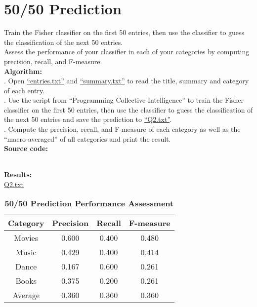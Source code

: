 \documentclass{article}
\begin{document}
		\section{50/50 Prediction}
		Train the Fisher classifier on the first 50 entries, then use the classifier to guess the classification of the
next 50 entries.\\
		\indent Assess the performance of your classifier in each of your categories by computing precision, recall, and F-measure.\\

		\noindent\textbf{Algorithm:}\\
		. Open \href{https://github.com/zhangboroy/cs532-s17/blob/master/assg09_submission/entries.txt}{``entries.txt''} and \href{https://github.com/zhangboroy/cs532-s17/blob/master/assg09_submission/summary.txt}{``summary.txt''} to read the title, summary and category of each entry.\\
		. Use the script from ``Programming Collective Intelligence'' to train the Fisher classifier on the first 50 entries, then use the classifier to guess the classification of the next 50 entries and save the prediction to \href{https://github.com/zhangboroy/cs532-s17/blob/master/assg09_submission/Q2.txt}{``Q2.txt''}.\\
		. Compute the precision, recall, and F-measure of each category as well as the ``macro-averaged''
of all categories and print the result.\\

		\noindent\textbf{Source code:}
		

		\noindent\\\textbf{Results:}\\
		\indent\href{https://github.com/zhangboroy/cs532-s17/blob/master/assg09_submission/Q2.txt}{Q2.txt}
		\begin{table}[!htb]
			\centering
			\caption{\textbf{50/50 Prediction Performance Assessment}}
			\begin{tabular}{cccc}
				\toprule
				\textbf{Category} & \textbf{Precision} & \textbf{Recall} & \textbf{F-measure}\\
				\midrule
				Movies & 0.600 & 0.400 & 0.480\\
				Music & 0.429 & 0.400 & 0.414\\
				Dance & 0.167 & 0.600 & 0.261\\
				Books & 0.375 & 0.200 & 0.261\\
				Average & 0.360 & 0.360 & 0.360\\				
				\bottomrule
			\end{tabular}
		\end{table}
\end{document}
